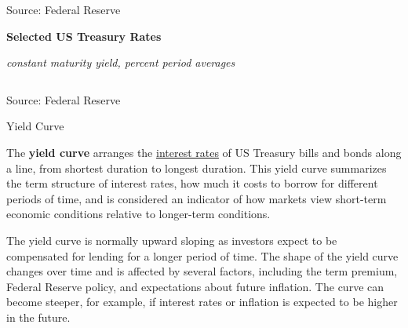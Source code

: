 \documentclass{report}
\newcommand{\tbllink}[1]{\href{https://raw.githubusercontent.com/bdecon/US-chartbook/master/chartbook/data/#1}{\faTable}}
\begin{document}
{\begin{minipage}{0.98\textwidth}
\footnotesize{Source: Federal Reserve} \hfill \tbllink{rates.csv}
\vspace{3mm}

\normalsize \textbf{Selected US Treasury Rates}\\
\footnotesize{\textit{constant maturity yield, percent \hspace{18mm}period averages}\\
\hspace*{-3mm}  \setlength{\tabcolsep}{2.0pt} \color{black!90}
		{\renewcommand{\arraystretch}{1.55}
\begin{tabular}{p{17mm} R{10.2mm} R{10.2mm} R{10.2mm} R{9.5mm}
		 		 R{9.5mm} R{9.5mm} R{9.5mm} R{9.5mm} R{9.5mm}}
			  \hline
		\end{tabular}}}

\vspace{-2mm}		
\footnotesize{Source: Federal Reserve}
\end{minipage}
\newpage
\vspace*{-11mm}

\begin{minipage}{1.0\textwidth}  
\normalsize Yield Curve
\vspace*{-1mm}

\small The \textbf{yield curve} arranges the \href{https://www.treasury.gov/resource-center/data-chart-center/interest-rates/Pages/TextView.aspx?data=yield}{interest rates} of US Treasury bills and bonds along a line, from shortest duration to longest duration. This yield curve summarizes the term structure of interest rates, how much it costs to borrow for different periods of time, and is considered an indicator of how markets view short-term economic conditions relative to longer-term conditions. 

The yield curve is normally upward sloping as investors expect to be compensated for lending for a longer period of time. The shape of the yield curve changes over time and is affected by several factors, including the term premium, Federal Reserve policy, and expectations about future inflation. The curve can become steeper, for example, if interest rates or inflation is expected to be higher in the future. 
\end{minipage}

\begin{minipage}{0.425\textwidth} 
\vspace{-2.5mm}


\end{minipage}}
\end{document}
